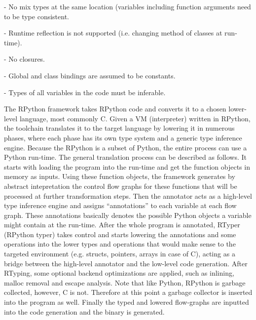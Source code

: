 - No mix types at the same location (variables including function arguments need to be type consistent.

- Runtime reflection is not supported (i.e. changing method of classes at run-time).

- No closures.

- Global and class bindings are assumed to be constants.

- Types of all variables in the code must be inferable.



The RPython framework takes RPython code and converts it to a chosen
lower-level language, most commonly C. Given a VM (interpreter)
written in RPython, the toolchain translates it to the target language
by lowering it in numerous phases, where each phase has its own type
system and a generic type inference engine. Because the RPython is a
subset of Python, the entire process can use a Python run-time. The
general translation process can be described as follows. It starts
with loading the program into the run-time and get the function
objects in memory as inputs. Using these function objects, the
framework generates by abstract intepretation the control flow graphs
for these functions that will be processed at further transformation
steps. Then the annotator acts as a high-level type inference engine
and assigns ``annotations'' to each variable at each flow graph. These
annotations basically denotes the possible Python objects a variable
might contain at the run-time. After the whole program is annotated,
RTyper (RPython typer) takes control and starts lowering the
annotations and some operations into the lower types and operations
that would make sense to the targeted environment (e.g. structs,
pointers, arrays in case of C), acting as a bridge between the
high-level annotator and the low-level code generation. After RTyping,
some optional backend optimizations are applied, such as inlining,
malloc removal and escape analysis. Note that like Python, RPython is
garbage collected, however, C is not. Therefore at this point a
garbage collector is inserted into the program as well. Finally the
typed and lowered flow-graphs are inputted into the code generation
and the binary is generated. \cite{rpython07, pypy06, pypy08}
